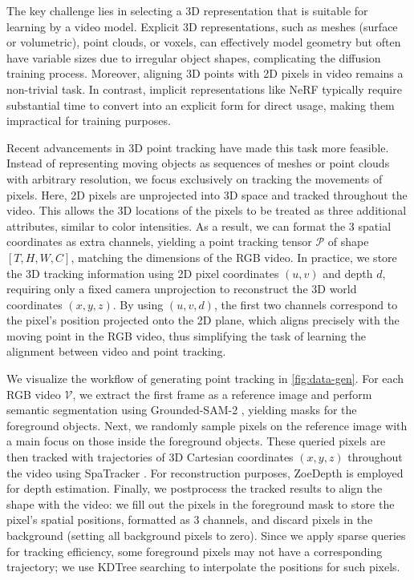 The key challenge lies in selecting a 3D representation that is suitable for learning by a video model. Explicit 3D representations, such as meshes (surface or volumetric), point clouds, or voxels, can effectively model geometry but often have variable sizes due to irregular object shapes, complicating the diffusion training process. Moreover, aligning 3D points with 2D pixels in video remains a non-trivial task. In contrast, implicit representations like NeRF \cite{mildenhall2021nerf} typically require substantial time to convert into an explicit form for direct usage, making them impractical for training purposes.


Recent advancements in 3D point tracking \cite{xiao2024spatialtracker} have made this task more feasible. Instead of representing moving objects as sequences of meshes or point clouds with arbitrary resolution, we focus exclusively on tracking the movements of pixels. Here, 2D pixels are unprojected into 3D space and tracked throughout the video. This allows the 3D locations of the pixels to be treated as three additional attributes, similar to color intensities. As a result, we can format the 3 spatial coordinates as extra channels, yielding a point tracking tensor $\mathcal{P}$ of shape $[T, H, W, C]$, matching the dimensions of the RGB video. In practice, we store the 3D tracking information using 2D pixel coordinates $(u, v)$ and depth $d$, requiring only a fixed camera unprojection to reconstruct the 3D world coordinates $(x, y, z)$. By using $(u, v, d)$, the first two channels correspond to the pixel's position projected onto the 2D plane, which aligns precisely with the moving point in the RGB video, thus simplifying the task of learning the alignment between video and point tracking.

We visualize the workflow of generating point tracking in \autoref{fig:data-gen}. For each RGB video $\mathcal{V}$, we extract the first frame as a reference image and perform semantic segmentation using Grounded-SAM-2 \cite{ren2024grounded,ravi2024sam2segmentimages}, yielding masks for the foreground objects. Next, we randomly sample pixels on the reference image with a main focus on those inside the foreground objects. These queried pixels are then tracked with trajectories of 3D Cartesian coordinates $(x, y, z)$ throughout the video using SpaTracker \cite{xiao2024spatialtracker}. For reconstruction purposes, ZoeDepth \cite{bhat2023zoedepth} is employed for depth estimation. Finally, we postprocess the tracked results to align the shape with the video: we fill out the pixels in the foreground mask to store the pixel's spatial positions, formatted as 3 channels, and discard pixels in the background (setting all background pixels to zero). Since we apply sparse queries for tracking efficiency, some foreground pixels may not have a corresponding trajectory; 
we use KDTree searching to interpolate the positions for such pixels.

